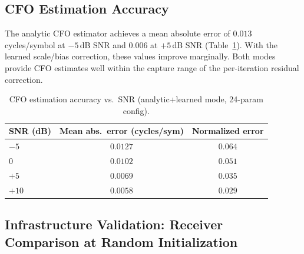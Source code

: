 \documentclass{article}
\begin{document}
\subsection{CFO Estimation Accuracy}

The analytic CFO estimator achieves a mean absolute error of $0.013$ cycles/symbol at $-5$\,dB SNR and $0.006$ at $+5$\,dB SNR (Table~\ref{tab:cfo}). With the learned scale/bias correction, these values improve marginally. Both modes provide CFO estimates well within the capture range of the per-iteration residual correction.

\begin{table}[h]
  \centering
  \caption{CFO estimation accuracy vs.\ SNR (analytic+learned mode, 24-param config).}
  \label{tab:cfo}
  \begin{tabular}{@{}lcc@{}}
    \toprule
    SNR (dB) & Mean abs.\ error (cycles/sym) & Normalized error \\
    \midrule
    $-5$ & $0.0127$ & $0.064$ \\
    $0$  & $0.0102$ & $0.051$ \\
    $+5$ & $0.0069$ & $0.035$ \\
    $+10$ & $0.0058$ & $0.029$ \\
    \bottomrule
  \end{tabular}
\end{table}

\subsection{Infrastructure Validation: Receiver Comparison at Random Initialization}
\label{sec:infra_check}
\end{document}
